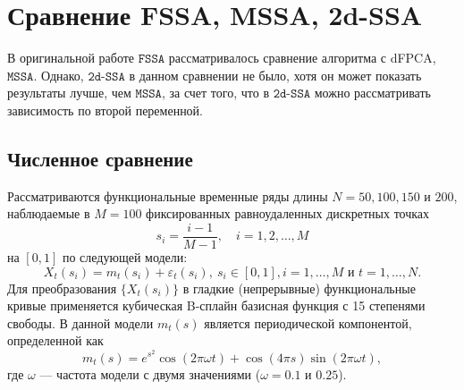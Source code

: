 \documentclass[12pt, specialist, subf
]{disser}
\theoremstyle{definition}
\newcommand{\SSA}{\texttt{SSA}}
\newcommand{\MSSA}{\texttt{MSSA}}
\newcommand{\FSSA}{\texttt{FSSA}}
\newcommand{\DSSA}{\texttt{2d-SSA}}
\newcommand{\TS}{\mathsf{X}}
\begin{document}










\section{Сравнение FSSA, MSSA, 2d-SSA}

\label{sec:compare_fssa_ssa}

В оригинальной работе $\FSSA$ \cite{haghbin2019functionalsingularspectrumanalysis} рассматривалось сравнение алгоритма с dFPCA, $\MSSA$. Однако, $\DSSA$ в данном сравнении не было, хотя он может показать результаты лучше, чем $\MSSA$, за счет того, что в $\DSSA$ можно рассматривать зависимость по второй переменной.


\subsection{Численное сравнение}

Рассматриваются функциональные временные ряды длины $N=50, 100, 150$ и $200$, наблюдаемые в $M=100$ фиксированных равноудаленных дискретных точках \[
s_i = \frac{i - 1}{M - 1}, \quad i = 1, 2, \dots, M
\] на $[0,1]$ по следующей модели:
\begin{equation}\label{eq:mainmodel}
	X_t\left(s_i\right)=m_t(s_i)+\varepsilon_t\left(s_i\right),\ s_i \in [0,1], i=1,\ldots,M \text{ и } t=1, \dots, N.
\end{equation}
Для преобразования $\{X_t(s_i)\}$ в гладкие (непрерывные) функциональные кривые применяется кубическая B-сплайн базисная функция с 15 степенями свободы. В данной модели $m_t(s)$ является периодической компонентой, определенной как
\begin{equation}\label{eq:Trend}
	m_t(s)=e^{s^2} \cos\left(2\pi \omega t\right)+\cos(4\pi s) \sin\left(2\pi \omega t\right),
\end{equation}
где $\omega$ — частота модели с двумя значениями ($\omega=0.1$ и $0.25$).
\end{document}
